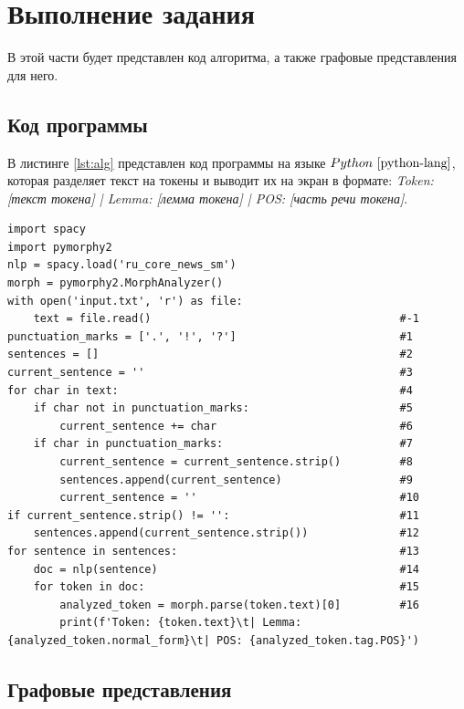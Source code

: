 \chapter{Выполнение задания}

В этой части будет представлен код алгоритма, а также графовые представления для него.

\section{Код программы}

В листинге \ref{lst:alg} представлен код программы на языке $Python~\cite{python-lang}$, которая разделяет текст на токены и выводит их на экран в формате: \textit{Token: [текст токена] | Lemma: [лемма токена] | POS: [часть речи токена]}.


\begin{center}
	\captionsetup{justification=raggedright,singlelinecheck=off}
	\begin{lstlisting}[label=lst:alg,caption=код программы]
import spacy
import pymorphy2
nlp = spacy.load('ru_core_news_sm')
morph = pymorphy2.MorphAnalyzer()
with open('input.txt', 'r') as file:
	text = file.read()                                      #-1
punctuation_marks = ['.', '!', '?']                         #1
sentences = []                                              #2
current_sentence = ''                                       #3
for char in text:                                           #4               
	if char not in punctuation_marks:                       #5      
		current_sentence += char                            #6
	if char in punctuation_marks:                           #7
		current_sentence = current_sentence.strip()         #8
		sentences.append(current_sentence)                  #9
		current_sentence = ''                               #10
if current_sentence.strip() != '':                          #11
	sentences.append(current_sentence.strip())              #12
for sentence in sentences:                                  #13
	doc = nlp(sentence)                                     #14
	for token in doc:                                       #15
		analyzed_token = morph.parse(token.text)[0]         #16
		print(f'Token: {token.text}\t| Lemma: {analyzed_token.normal_form}\t| POS: {analyzed_token.tag.POS}')
	\end{lstlisting}
\end{center}


\section{Графовые представления}

